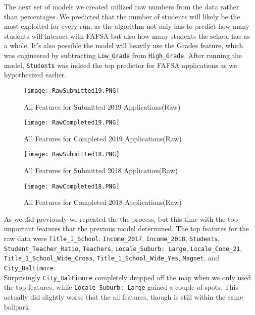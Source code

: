 \documentclass[12pt]{article}
\begin{document}
The next set of models we created utilized raw numbers from the data rather 
than percentages. We predicted that the number of students will likely be 
the most exploited for every run, as the algorithm not only has to predict 
how many students will interact with FAFSA but also how many students the 
school has as a whole. It's also possible the model will heavily use the 
Grades feature, which was engineered by subtracting \texttt{Low\_Grade}
from \texttt{High\_Grade}. After running the model, \texttt{Students} 
was indeed the top predictor for FAFSA applications as we hypothesized earlier.

\begin{figure}[!htb]
  \centering
  \texttt{[image: RawSubmitted19.PNG]}
  \caption{All Features for Submitted 2019 Applications(Raw)}
  \label{fig:feature_importance}
\end{figure}

\begin{figure}[!htb]
  \centering
  \texttt{[image: RawCompleted19.PNG]}
  \caption{All Features for Completed 2019 Applications(Raw)}
  \label{fig:feature_importance}
\end{figure}

\begin{figure}[!htb]
  \centering
  \texttt{[image: RawSubmitted18.PNG]}
  \caption{All Features for Submitted 2018 Application(Raw)}
  \label{fig:feature_importance}
\end{figure}

\begin{figure}[!htb]
  \centering
  \texttt{[image: RawCompleted18.PNG]}
  \caption{All Features for Completed 2018 Applications(Raw)}
  \label{fig:feature_importance}
\end{figure}

As we did previously we repeated the the process, but this time with the top 
important features that the previous model determined. The top features for 
the raw data were \texttt{Title\_I\_School}, \texttt{Income\_2017}, 
\texttt{Income\_2018}, \texttt{Students}, \texttt{Student\_Teacher\_Ratio}, 
\texttt{Teachers}, \texttt{Locale\_Suburb: Large}, \texttt{Locale\_Code\_21},
\texttt{Title\_1\_School\_Wide\_Cross}, \texttt{Title\_1\_School\_Wide\_Yes}, 
\texttt{Magnet}, and \texttt{City\_Baltimore}.\\

Surprisingly \texttt{City\_Baltimore} completely dropped off the map when we 
only used the top features, while \texttt{Locale\_Suburb: Large} gained a 
couple of spots. This actually did slightly worse that the all features, 
though is still within the same ballpark.
\end{document}
